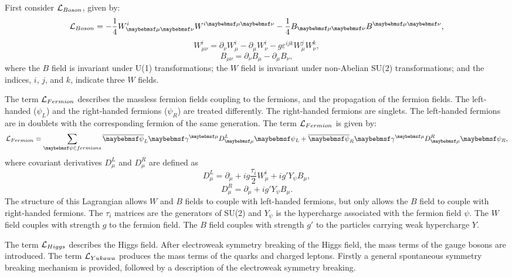 First consider $\operatorname{\mathcal{L}}_{Boson}$, given by:
\begin{equation}
\Lagr_{Boson} = - \frac{1}{4} W^i_{\mu\nu} W^{i\mu\nu} - \frac{1}{4}B_{\mu\nu} B^{\mu\nu},
\label{eq:theoryEWBoson}
\end{equation}
\begin{equation}
W^i_{\mu\nu} = \partial_{\nu}W^i_{\mu} - \partial_{\mu}W^i_{\nu} - g\varepsilon^{ijk}W^j_{\mu}W^k_\nu ,
\end{equation}
\begin{equation}
B_{\mu\nu} = \partial_{\nu}B_{\mu} - \partial_{\mu}B_{\nu},
\end{equation}
where the $B$ field  is invariant under U(1) transformations; the $W$ field is invariant under non-Abelian SU(2) transformations; and the indices, $i$, $j$, and $k$, indicate three $W$ fields.


The term $\operatorname{\mathcal{L}}_{Fermion}$ describes the massless fermion fields coupling to the fermions, and the propagation of the fermion fields. The left-handed ($ \psi_L $) and the right-handed fermions ($ \psi_R $) are treated differently. The right-handed fermions are singlets. The left-handed fermions are in doublets with the corresponding fermion of the same generation. The term $\operatorname{\mathcal{L}}_{Fermion}$ is given by:
\begin{equation}
\Lagr_{Fermion} = \sum_{\psi\in{fermions}} {\overline{\psi}}_L \gamma^{\mu}D^L_{\mu} \psi_L +  \overline{\psi}_R \gamma^{\mu}D^R_{\mu} \psi_R ,
\end{equation}
where covariant derivatives $D^L_{\mu}$ and $D^R_{\mu}$ are defined as
\begin{equation}
D^L_{\mu} = \partial_{\mu} + ig\frac{\tau_i}{2}W^i_{\mu} + ig'Y_{\psi}B_{\mu} ,
\end{equation}
\begin{equation}
D^R_{\mu} = \partial_{\mu}  + ig'Y_{\psi}B_{\mu} .
\end{equation}
The structure of this Lagrangian allows $W$ and $B$ fields to couple with left-handed fermions, but only allows the $B$ field to couple with right-handed fermions. The $\tau_i$ matrices are the generators of SU(2) and $Y_{\psi}$ is the hypercharge associated with the fermion field $\psi$. The $W$ field couples with strength $g$ to the fermion field. The $B$ field couples with strength $g'$ to the particles carrying weak hypercharge $Y$.

The term $\operatorname{\mathcal{L}}_{Higgs}$ describes the Higgs field. After electroweak symmetry breaking of the Higgs field, the mass terms of the gauge bosons are introduced. The term $ \operatorname{\mathcal{L}}_{Yukawa}$ produces the mass terms of the quarks and charged leptons. Firstly a general  spontaneous symmetry breaking mechanism is provided, followed by a description of the electroweak symmetry breaking.


